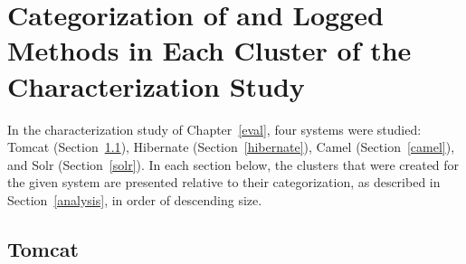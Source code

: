 
\chapter{Categorization of and Logged Methods in Each Cluster of the Characterization Study}\label{appendB}

In the characterization study of Chapter~\ref{eval}, four systems were studied: Tomcat (Section~\ref{tomcat}), Hibernate (Section~\ref{hibernate}), Camel (Section~\ref{camel}), and Solr (Section~\ref{solr}). In each section below, the clusters that were created for the given system are presented relative to their categorization, as described in Section~\ref{analysis}, in order of descending size.

\section{Tomcat}\label{tomcat}

